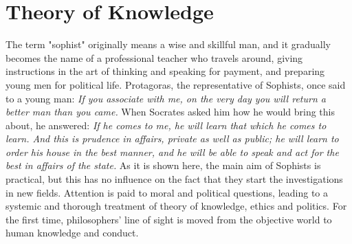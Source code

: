 \documentclass[11pt]{article}
\begin{document}
\begin{sloppypar}
\section{Theory of Knowledge}
The term "sophist" originally means a wise and skillful man, and it gradually becomes the name of a professional teacher who travels around, giving instructions in the art of thinking and speaking for payment, and preparing young men for political life. 
Protagoras, the representative of Sophists, once said to a young man:
\newline
\textit{If you associate with me, on the very day you will return a better man than you came.}
\newline
When Socrates asked him how he would bring this about, he answered:
\newline
\textit{If he comes to me, he will learn that which he comes to learn. And this is prudence in affairs, private as well as public; he will learn to order his house in the best manner, and he will be able to speak and act for the best in affairs of the state.}
\newline
As it is shown here, the main aim of Sophists is practical, but this has no influence on the fact that they start the investigations in new fields. 
Attention is paid to moral and political questions, leading to a systemic and thorough treatment of theory of knowledge, ethics and politics. 
For the first time, philosophers’ line of sight is moved from the objective world to human knowledge and conduct. 

\par


\end{sloppypar}
\end{document}
